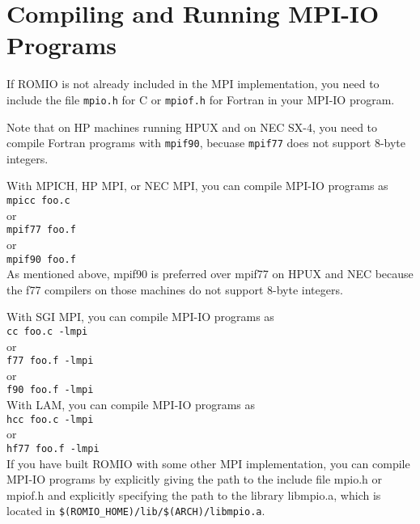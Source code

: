 %
%
\section{Compiling and Running MPI-IO Programs}
If ROMIO is not already included in the MPI implementation, you need
to include the file {\tt mpio.h} for C or {\tt mpiof.h} for Fortran in
your MPI-IO program.  

Note that on HP machines running HPUX and on NEC SX-4, you need to
compile Fortran programs with {\tt mpif90}, becuase {\tt mpif77} does
not support 8-byte integers. 

With MPICH, HP MPI, or NEC MPI, you can compile MPI-IO programs as \\
\hspace*{.4in} {\tt mpicc foo.c}\\
or \\
\hspace*{.4in} {\tt mpif77 foo.f }\\
or\\
\hspace*{.4in} {\tt mpif90 foo.f}\\

As mentioned above, mpif90 is preferred over mpif77 on HPUX and NEC
because the f77 compilers on those machines do not support 8-byte integers.

With SGI MPI, you can compile MPI-IO programs as \\
\hspace*{.4in} {\tt cc foo.c -lmpi}\\
or \\
\hspace*{.4in} {\tt f77 foo.f -lmpi}\\
or \\
\hspace*{.4in} {\tt f90 foo.f -lmpi}\\

With LAM, you can compile MPI-IO programs as \\
\hspace*{.4in} {\tt hcc foo.c -lmpi}\\
or \\
\hspace*{.4in} {\tt hf77 foo.f -lmpi}\\

If you have built ROMIO with some other MPI implementation, you can
compile MPI-IO programs by explicitly giving the path to the include
file mpio.h or mpiof.h and explicitly specifying the path to the
library libmpio.a, which is located in {\tt \$(ROMIO\_HOME)/lib/\$(ARCH)/libmpio.a}.

